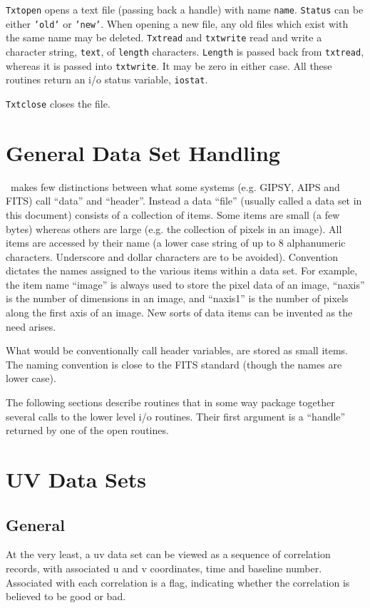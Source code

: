 {\tt Txtopen} opens a text file (passing back a handle) with name {\tt name}.
{\tt Status} can be either {\tt 'old'} or {\tt 'new'}. When opening a new
file, any old files which exist with the same name may be deleted.
{\tt Txtread} and {\tt txtwrite} read and write a character string, {\tt text},
of {\tt length} characters. {\tt Length} is passed back from {\tt txtread},
whereas it is passed into {\tt txtwrite}. It may be zero in either case.
All these routines return an i/o status variable, {\tt iostat}.

{\tt Txtclose} closes the file.

\section{General Data Set Handling}
\miriad\ makes few distinctions between what some systems (e.g. GIPSY,
AIPS and FITS) call ``data'' and ``header''.
Instead a data ``file'' (usually called a data set in this
document) consists of a collection of items. Some
items are small (a few bytes) whereas others are large (e.g. the collection
of pixels in an image). All items are accessed by their name (a lower case
string of up to 8 alphanumeric characters. Underscore and dollar
characters are to be avoided). Convention dictates the names
assigned to the various items within a data set. For example, the
item name ``image'' is always used to store the pixel data of an image, 
``naxis'' is the number of dimensions in an image, and ``naxis1'' is
the number of pixels along the first axis of an image. New
sorts of data items can be invented as the need arises.

What would be conventionally call header variables, are stored as small items.
The naming convention is close to the FITS standard (though the names are
lower case).

The following sections describe routines that in some way package together
several calls to the lower level i/o routines. Their first argument is
a ``handle'' returned by one of the open routines.

\section{UV Data Sets}
\subsection{General}
At the very least, a uv data set can be viewed as a sequence of 
correlation
records, with associated u and v coordinates, time and baseline number.
Associated with each correlation is a flag, indicating whether the
correlation is believed to be good or bad.


